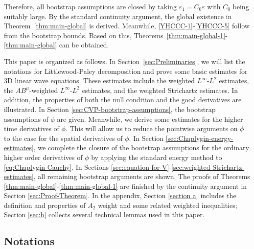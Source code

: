 \documentclass[11pt,twoside]{article}
\theoremstyle{plain}
\theoremstyle{definition}
\theoremstyle{assumption}
\numberwithin{equation}{section}
\begin{document}
	Therefore, all bootstrap assumptions are closed by taking
	\(\varepsilon_1=C_0\varepsilon\) with \(C_0\) being suitably large.  By the standard continuity argument,
the global existence in  Theorem~\ref{thm:main-global} is derived. Meanwhile, \eqref{YHCCC-1}-\eqref{YHCCC-5} follow from
the bootstrap bounds. Based on this,  Theorems~\ref{thm:main-global-1}-\ref{thm:main-global}
 can be obtained.
	
	
	
	
	
	
	
	
	
	
	
	This paper is organized as follows. In
	Section~\ref{sec:Preliminaries}, we will list the notations for Littlewood-Paley decomposition and prove some basic
	estimates for 3D linear wave equations. These estimates include the weighted
	\(L^\infty\)-\(L^2\) estimates, the \(AB^\mu\)-weighted
	\(L^\infty\)-\(L^2\) estimates, and the weighted Strichartz estimates.
In addition, the properties of both the null condition and the good derivatives are illustrated.
	In Section \ref{sec:CVP-bootstrap-assumptions}, the bootstrap assumptions of $\phi$ are given. Meanwhile,
we derive some estimates for the higher time derivatives of $\phi$.
This will allow us to reduce the
	pointwise arguments on $\phi$ to the case for the spatial derivatives of $\phi$.
	In Section \ref{sec:Chaplygin-energy-estimates}, we complete the closure of the bootstrap
assumptions for the ordinary higher order derivatives of  $\phi$
by applying the standard energy method to \eqref{eq:Chaplygin-Cauchy}.
	In Sections \ref{sec:equation-for-V}-\ref{sec:weighted-Strichartz-estimates}, all remaining bootstrap
arguments are shown.
	The proofs of Theorems \ref{thm:main-global}-\ref{thm:main-global-1}
	are finished  by the continuity argument in Section \ref{sec:Proof-Theorem}.
	In the appendix, Section \ref{section a} includes the definition and properties of $A_2$ weight and some related weighted inequalities;
Section \ref{sec:b} collects several technical lemmas used in this paper.
	
	
	
	
	
	
	
	
	
	
	
	\subsection{Notations}\label{subsec:notations}
	
\end{document}
